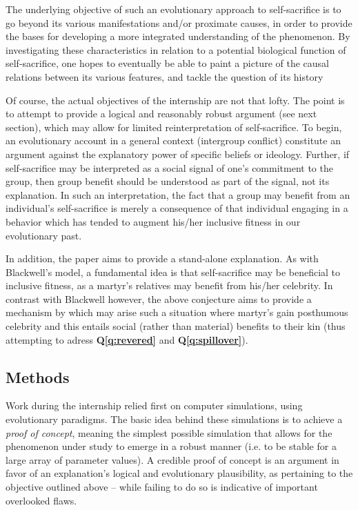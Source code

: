 \documentclass[a4paper,12pt]{report}
\begin{document}
The underlying objective of such an evolutionary approach to self-sacrifice is
to go beyond its various manifestations and/or proximate causes,
in order to provide the bases for developing a more integrated understanding
of the phenomenon. By investigating these characteristics in relation to a potential
biological function of self-sacrifice, one hopes to eventually
be able to paint a picture of the causal relations between its various features,
and tackle the question of its history %

Of course, the actual objectives of the internship are not that lofty.
The point is to attempt to provide a logical and reasonably robust argument
(see next section), which may allow for limited reinterpretation of self-sacrifice.
To begin, an evolutionary account in a general context (intergroup conflict)
constitute an argument against the explanatory power of specific beliefs or ideology.
Further, if self-sacrifice may be interpreted as a social signal of one’s
commitment to the group, then group benefit should be understood as part of the signal,
not its explanation. In such an interpretation, the fact that a group may benefit
from an individual’s self-sacrifice is merely a consequence of that individual
engaging in a behavior which has tended to augment his/her inclusive fitness
in our evolutionary past. 

In addition, the paper aims to provide a stand-alone explanation.
As with Blackwell’s %
model, a fundamental idea is that self-sacrifice
may be beneficial to inclusive fitness, as a martyr’s relatives may benefit
from his/her celebrity. In contrast with Blackwell however, the above 
conjecture aims to provide a mechanism by which may arise such a situation where
martyr’s gain posthumous celebrity and this entails social (rather than material)
benefits to their kin (thus attempting to adress \textbf{Q\ref{q:revered}} and
\textbf{Q\ref{q:spillover}}).

\subsection{Methods}

Work during the internship relied first on computer simulations,
using evolutionary paradigms. The basic idea behind these simulations
is to achieve a \emph{proof of concept}, meaning the simplest possible simulation
that allows for the phenomenon under study to emerge in a robust manner
(i.e. to be stable for a large array of parameter values). A credible
proof of concept is an argument in favor of an explanation’s logical
and evolutionary plausibility, as pertaining to the objective outlined above
– while failing to do so is indicative of important overlooked flaws.
\end{document}
